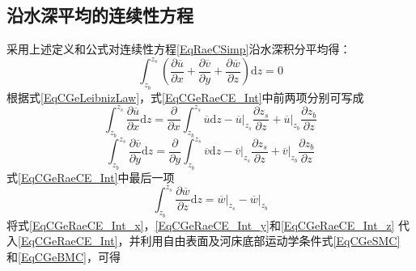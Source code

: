 \subsection{沿水深平均的连续性方程}
采用上述定义和公式对连续性方程\eqref{EqRaeCSimp}沿水深积分平均得：
\begin{equation}
  \int_{z_{b}}^{ z_{s}}\!
  \left(
  \frac{\partial \overline{u}}{\partial x} +
  \frac{\partial \overline{v}}{\partial y} +
  \frac{\partial \overline{w}}{\partial z} 
  \right)
  \mathrm{d}z
  =
  0
  \label{EqCGeRaeCE_Int}
\end{equation}
根据式\eqref{EqCGeLeibnizLaw}，式\eqref{EqCGeRaeCE_Int}中前两项分别可写成
\begin{equation}
  \int_{z_{b}}^{ z_{s}}\!
  \frac{\partial \overline{u}}{\partial x} 
  \mathrm{d}z
  =
  \frac{\partial}{\partial x}
  \int_{z_{b}}^{ z_{s}}\!
  \overline{u}
  \mathrm{d}z
  -
  \left.\overline{u}\right|_{z_{s}}
    \frac{\partial z_{s}}{\partial z}
  +
  \left.\overline{u}\right|_{z_{b}}
    \frac{\partial z_{b}}{\partial z}
\label{EqCGeRaeCE_Int_x}
\end{equation}
\begin{equation}
  \int_{z_{b}}^{ z_{s}}\!
  \frac{\partial \overline{v}}{\partial y} 
  \mathrm{d}z
  =
  \frac{\partial}{\partial y}
  \int_{z_{b}}^{ z_{s}}\!
  \overline{v}
  \mathrm{d}z
  -
  \left.\overline{v}\right|_{z_{s}}
    \frac{\partial z_{s}}{\partial z}
  +
  \left.\overline{v}\right|_{z_{b}}
    \frac{\partial z_{b}}{\partial z}
\label{EqCGeRaeCE_Int_y}
\end{equation}
式\eqref{EqCGeRaeCE_Int}中最后一项
\begin{equation}
  \int_{z_{b}}^{ z_{s}}\!
  \frac{\partial \overline{w}}{\partial z} 
  \mathrm{d}z
  =
  \left.\overline{w}\right|_{z_{s}}
    -
    \left.\overline{w}\right|_{z_{b}}
\label{EqCGeRaeCE_Int_z}
\end{equation}
将式\eqref{EqCGeRaeCE_Int_x}，\eqref{EqCGeRaeCE_Int_y}和\eqref{EqCGeRaeCE_Int_z}
代入\eqref{EqCGeRaeCE_Int}，并利用自由表面及河床底部运动学条件式\eqref{EqCGeSMC}
和\eqref{EqCGeBMC}，可得
